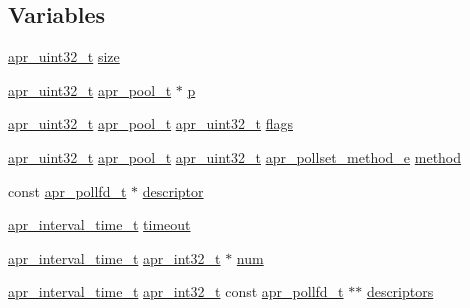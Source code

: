 \subsection*{Variables}
\begin{DoxyCompactItemize}
\item 
\hyperlink{group__apr__platform_ga558548a135d8a816c4787250744ea147}{apr\+\_\+uint32\+\_\+t} \hyperlink{group__apr__poll_ga7da682250c23eaa2193d58188e2cf96c}{size}
\item 
\hyperlink{group__apr__platform_ga558548a135d8a816c4787250744ea147}{apr\+\_\+uint32\+\_\+t} \hyperlink{structapr__pool__t}{apr\+\_\+pool\+\_\+t} $\ast$ \hyperlink{group__apr__poll_ga28e6897534e326f77e900eb1453b4fea}{p}
\item 
\hyperlink{group__apr__platform_ga558548a135d8a816c4787250744ea147}{apr\+\_\+uint32\+\_\+t} \hyperlink{structapr__pool__t}{apr\+\_\+pool\+\_\+t} \hyperlink{group__apr__platform_ga558548a135d8a816c4787250744ea147}{apr\+\_\+uint32\+\_\+t} \hyperlink{group__apr__poll_gaf8cd8dfff060e0cd10e32063eef7d30c}{flags}
\item 
\hyperlink{group__apr__platform_ga558548a135d8a816c4787250744ea147}{apr\+\_\+uint32\+\_\+t} \hyperlink{structapr__pool__t}{apr\+\_\+pool\+\_\+t} \hyperlink{group__apr__platform_ga558548a135d8a816c4787250744ea147}{apr\+\_\+uint32\+\_\+t} \hyperlink{group__apr__poll_gabe6f1238ea45e9425fa052e2788e4a29}{apr\+\_\+pollset\+\_\+method\+\_\+e} \hyperlink{group__apr__poll_ga6c1b16298acdfc2ca3cba871da0daa17}{method}
\item 
const \hyperlink{structapr__pollfd__t}{apr\+\_\+pollfd\+\_\+t} $\ast$ \hyperlink{group__apr__poll_ga93f9312d40401caaec1865013fe2bf61}{descriptor}
\item 
\hyperlink{group__apr__time_gaae2129185a395cc393f76fabf4f43e47}{apr\+\_\+interval\+\_\+time\+\_\+t} \hyperlink{group__apr__poll_ga9ceb71d3d9fcd18962d16e49bef6153a}{timeout}
\item 
\hyperlink{group__apr__time_gaae2129185a395cc393f76fabf4f43e47}{apr\+\_\+interval\+\_\+time\+\_\+t} \hyperlink{group__apr__platform_ga21ef1e35fd3ff9be386f3cb20164ff02}{apr\+\_\+int32\+\_\+t} $\ast$ \hyperlink{group__apr__poll_ga8c10598f743ada9822ab203974a58304}{num}
\item 
\hyperlink{group__apr__time_gaae2129185a395cc393f76fabf4f43e47}{apr\+\_\+interval\+\_\+time\+\_\+t} \hyperlink{group__apr__platform_ga21ef1e35fd3ff9be386f3cb20164ff02}{apr\+\_\+int32\+\_\+t} const \hyperlink{structapr__pollfd__t}{apr\+\_\+pollfd\+\_\+t} $\ast$$\ast$ \hyperlink{group__apr__poll_ga79b31f5f6b249ca41dcc8a49b8fd5aa9}{descriptors}
$$
\end{DoxyCompactItemize}
